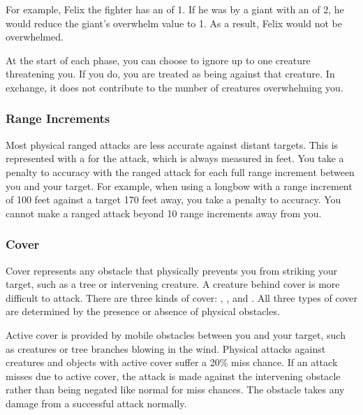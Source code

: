             For example, Felix the fighter has an  of 1.
            If he was  by a giant with an  of 2, he would reduce the giant's overwhelm value to 1.
            As a result, Felix would not be overwhelmed.

             At the start of each phase, you can choose to ignore up to one creature threatening you.
            If you do, you are treated as being \unaware against that creature.
            In exchange, it does not contribute to the number of creatures overwhelming you.

        \subsubsection{Range Increments}\label{Range Increments}
            Most physical ranged attacks are less accurate against distant targets.
            This is represented with a  for the attack, which is always measured in feet.
            You take a  penalty to accuracy with the ranged attack for each full range increment between you and your target.
            For example, when using a longbow with a range increment of 100 feet against a target 170 feet away, you take a  penalty to accuracy.
            You cannot make a ranged attack beyond 10 range increments away from you.

        \subsubsection{Cover}\label{Cover}

            Cover represents any obstacle that physically prevents you from striking your target, such as a tree or intervening creature.
            A creature behind cover is more difficult to attack.
            There are three kinds of cover: , , and .
            All three types of cover are determined by the presence or absence of physical obstacles.

            \label{Active Cover} Active cover is provided by mobile obstacles between you and your target, such as creatures or tree branches blowing in the wind.
            Physical attacks against creatures and objects with active cover suffer a 20\% miss chance.
            If an attack misses due to active cover, the attack is made against the intervening obstacle rather than being negated like normal for miss chances.
            The obstacle takes any damage from a successful attack normally.

